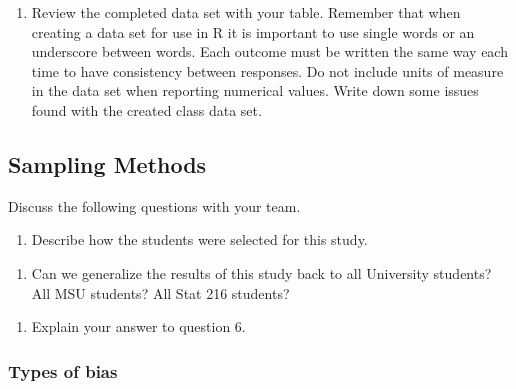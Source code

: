 \documentclass[
]{report}
\providecommand{\tightlist}{%
  \setlength{\itemsep}{0pt}\setlength{\parskip}{0pt}}
\begin{document}
\newpage

\begin{enumerate}
\def\labelenumi{\arabic{enumi}.}
\setcounter{enumi}{3}
\tightlist
\item
  Review the completed data set with your table. Remember that when creating a data set for use in R it is important to use single words or an underscore between words. Each outcome must be written the same way each time to have consistency between responses. Do not include units of measure in the data set when reporting numerical values. Write down some issues found with the created class data set.
\end{enumerate}

\vspace{2.5in}

\subsection{Sampling Methods}\label{sampling-methods}

Discuss the following questions with your team.

\begin{enumerate}
\def\labelenumi{\arabic{enumi}.}
\setcounter{enumi}{4}
\tightlist
\item
  Describe how the students were selected for this study.
\end{enumerate}

\vspace{1in}

\begin{enumerate}
\def\labelenumi{\arabic{enumi}.}
\setcounter{enumi}{5}
\tightlist
\item
  Can we generalize the results of this study back to all University students? All MSU students? All Stat 216 students?
\end{enumerate}

\vspace{1in}

\begin{enumerate}
\def\labelenumi{\arabic{enumi}.}
\setcounter{enumi}{6}
\tightlist
\item
  Explain your answer to question 6.
\end{enumerate}

\newpage

\subsubsection*{Types of bias}\label{types-of-bias}
\end{document}
